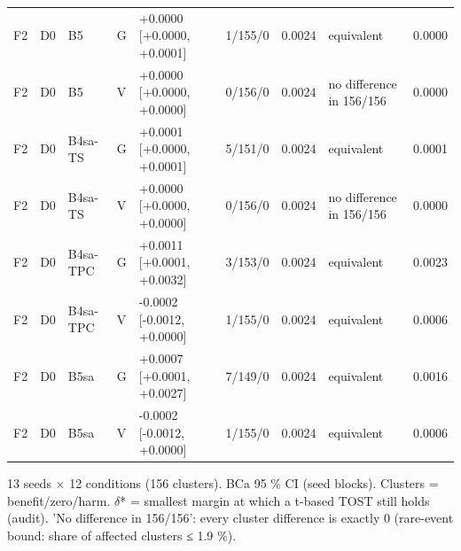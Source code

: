 \begin{table}[t]
\begin{tabular}{lllllllll}
F2 & D0 & B5 & G & +0.0000 [+0.0000, +0.0001] & 1/155/0 & 0.0024 & equivalent & 0.0000 \\
F2 & D0 & B5 & V & +0.0000 [+0.0000, +0.0000] & 0/156/0 & 0.0024 & no difference in 156/156 & 0.0000 \\
F2 & D0 & B4sa-TS & G & +0.0001 [+0.0000, +0.0001] & 5/151/0 & 0.0024 & equivalent & 0.0001 \\
F2 & D0 & B4sa-TS & V & +0.0000 [+0.0000, +0.0000] & 0/156/0 & 0.0024 & no difference in 156/156 & 0.0000 \\
F2 & D0 & B4sa-TPC & G & +0.0011 [+0.0001, +0.0032] & 3/153/0 & 0.0024 & equivalent & 0.0023 \\
F2 & D0 & B4sa-TPC & V & -0.0002 [-0.0012, +0.0000] & 1/155/0 & 0.0024 & equivalent & 0.0006 \\
F2 & D0 & B5sa & G & +0.0007 [+0.0001, +0.0027] & 7/149/0 & 0.0024 & equivalent & 0.0016 \\
F2 & D0 & B5sa & V & -0.0002 [-0.0012, +0.0000] & 1/155/0 & 0.0024 & equivalent & 0.0006 \\
\bottomrule\end{tabular}
\par\smallskip\parbox{\linewidth}{\scriptsize 13 seeds × 12 conditions (156 clusters). BCa 95 \% CI (seed blocks). Clusters = benefit/zero/harm. $\delta$* = smallest margin at which a t-based TOST still holds (audit). 'No difference in 156/156': every cluster difference is exactly 0 (rare-event bound: share of affected clusters ≤ 1.9 \%).}\end{table}


